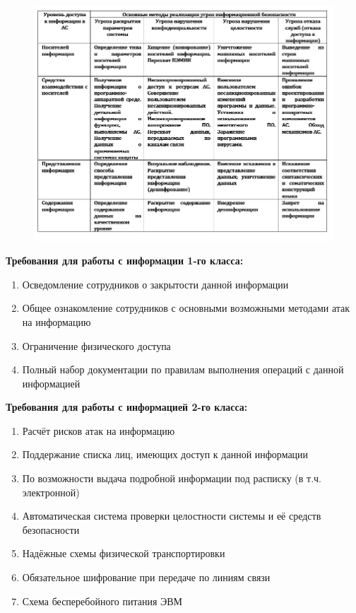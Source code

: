 \documentclass[a4paper,12pt]{extarticle}
\begin{document}
	
	\begin{figure}
		\centering
		\includegraphics[width=1.2\linewidth]{screenshot002}
		\caption{}
		\label{fig:screenshot002}
	\end{figure}
	
	\textbf{Требования для работы с информации 1-го класса:}
	\begin{enumerate}
		\item Осведомление сотрудников о закрытости данной информации
		\item Общее ознакомление сотрудников с основными возможными методами атак на информацию
		\item Ограничение физического доступа
		\item Полный набор документации по правилам выполнения операций с данной информацией
	\end{enumerate}

	
	\textbf{Требования для работы с информацией 2-го класса:}
	\begin{enumerate}
		\item Расчёт рисков атак на информацию
		\item Поддержание списка лиц, имеющих доступ к данной информации
		\item По возможности выдача подробной информации под расписку (в т.ч. электронной)
		\item Автоматическая система проверки целостности системы и её средств безопасности
		\item Надёжные схемы физической транспортировки
		\item Обязательное шифрование при передаче по линиям связи
		\item Схема бесперебойного питания ЭВМ
	\end{enumerate}
\end{document}
